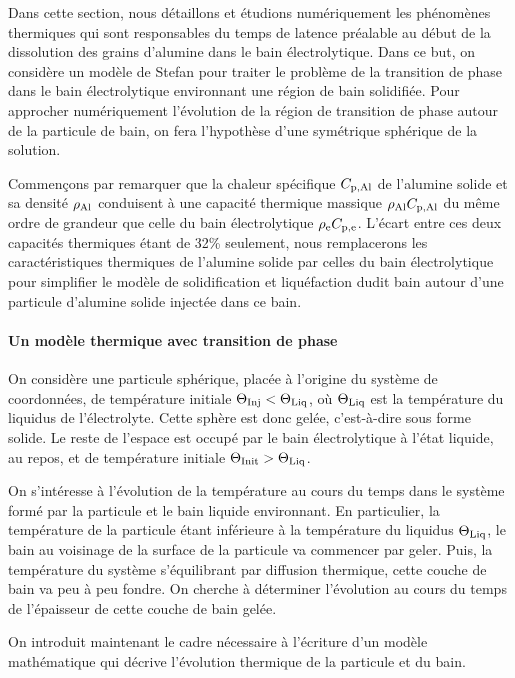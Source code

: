 Dans cette section, nous détaillons et étudions numériquement les
phénomènes thermiques qui sont responsables du temps de latence
préalable au début de la dissolution des grains d'alumine dans le bain
électrolytique. Dans ce but, on considère un modèle de Stefan pour
traiter le problème de la transition de phase dans le bain
électrolytique environnant une région de bain solidifiée. Pour
approcher numériquement l'évolution de la région de transition de
phase autour de la particule de bain, on fera l'hypothèse d'une
symétrique sphérique de la solution.

Commençons par remarquer que la chaleur spécifique $C_{\mathrm{p,Al}}$ de
l'alumine solide et sa densité $\rho_\mathrm{Al}$ conduisent à une
capacité thermique massique $\rho_\mathrm{Al}C_{\mathrm{p,Al}}$ du même ordre
de grandeur que celle du bain électrolytique
$\rho_\mathrm{e}C_{\mathrm{p,e}}$. L'écart entre ces deux capacités
thermiques étant de \num{32}\% seulement, nous remplacerons les
caractéristiques thermiques de l'alumine solide par celles du bain
électrolytique pour simplifier le modèle de solidification et
liquéfaction dudit bain autour d'une particule d'alumine solide
injectée dans ce bain.

\paragraph{Un modèle thermique avec transition de phase}
On considère une particule sphérique, placée à l'origine du système de
coordonnées, de température initiale $\Theta_\text{Inj}<\Theta_\text{Liq}$, où $\Theta_\text{Liq}$ est la
température du liquidus de l'électrolyte. Cette sphère est donc gelée,
c'est-à-dire sous forme solide. Le reste de l'espace est occupé par le
bain électrolytique à l'état liquide, au repos, et de température
initiale $\Theta_\text{Init} > \Theta_\text{Liq}$.

On s'intéresse à l'évolution de la température au cours du temps dans
le système formé par la particule et le bain liquide environnant. En
particulier, la température de la particule étant inférieure à la
température du liquidus $\Theta_\text{Liq}$, le bain au voisinage de la surface de
la particule va commencer par geler. Puis, la température du système
s'équilibrant par diffusion thermique, cette couche de bain va peu à
peu fondre. On cherche à déterminer l'évolution au cours du temps de
l'épaisseur de cette couche de bain gelée.

On introduit maintenant le cadre nécessaire à l'écriture d'un modèle
mathématique qui décrive l'évolution thermique de la particule et du
bain.

